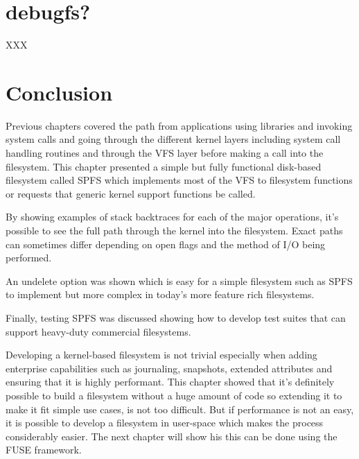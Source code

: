 \section{debugfs?}

XXX



\section{Conclusion}

Previous chapters covered the path from applications using libraries and invoking system calls and going through the different kernel layers including system call handling routines and through the VFS layer before making a call into the filesystem. This chapter presented a simple but fully functional disk-based filesystem called SPFS which implements most of the VFS to filesystem functions or requests that generic kernel support functions be called.

By showing examples of  stack backtraces for each of the major operations, it's possible to see the full path through the kernel into the filesystem. Exact paths can sometimes differ depending on open flags and the method of I/O being performed.

An undelete option was shown which is easy for a simple filesystem such as SPFS to implement but more complex in today's more feature rich filesystems.

Finally, testing SPFS was discussed showing how to develop test suites that can support heavy-duty commercial filesystems.

Developing a kernel-based filesystem is not trivial especially when adding enterprise capabilities such as journaling, snapshots, extended attributes and ensuring that it is highly performant. This chapter showed that it's definitely possible to build a filesystem without a huge amount of code so extending it to make it fit simple use cases, is not too difficult. But if performance is not an easy, it is possible to develop a filesystem in user-space which makes the process considerably easier. The next chapter will show his this can be done using the FUSE framework.

